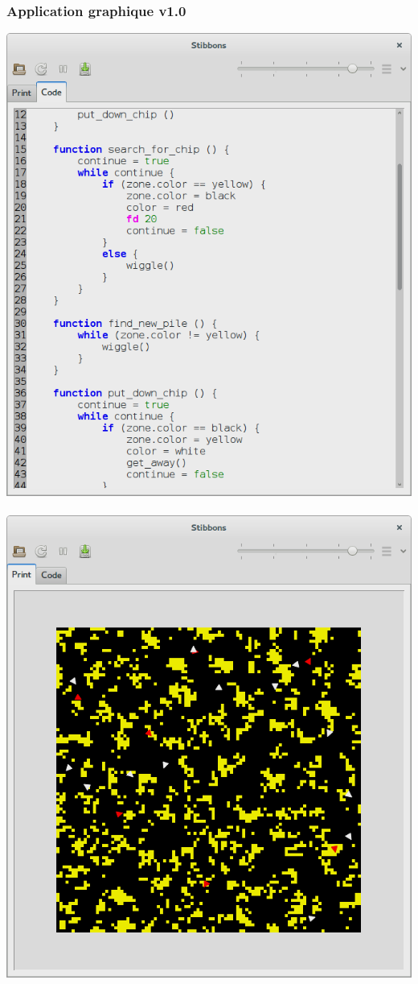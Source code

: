 \begin{frame}
\frametitle{Application graphique v1.0}
\begin{center}
\includegraphics[scale=0.16]{doc/Presentation/screenshot/stibbons-0-5-2.png}
~~~~~~~~
\includegraphics[scale=0.16]{doc/Presentation/screenshot/stibbons-0-5-3.png}
\end{center}


\end{frame}
